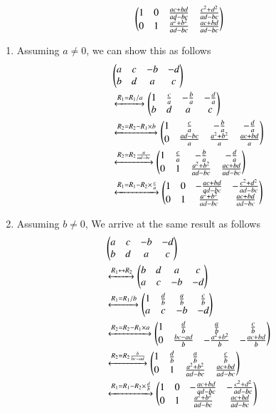 \documentclass[journal,12pt,twocolumn]{IEEEtran}
\begin{document}
\begin{align}
    \begin{pmatrix}1 & 0 & \frac{ac+bd}{ad-bc} & \frac{c^2+d^2}{ad-bc} \\ 0 & 1 & \frac{a^2+b^2}{ad-bc} & \frac{ac+bd}{ad-bc}\end{pmatrix}
\end{align}
\begin{enumerate}
    \item Assuming $a \neq 0$, we can show this as follows
    \begin{align}
        &\begin{pmatrix}a & c & -b & -d \\ b & d & a & c\end{pmatrix}  \nonumber \\
        &\xleftrightarrow{R_1 = R_1/a} \begin{pmatrix}1 & \frac{c}{a} & -\frac{b}{a} & -\frac{d}{a} \\ b & d & a & c\end{pmatrix} \nonumber \\
&\xleftrightarrow{R_2 = R_2 - R_1\times b} \begin{pmatrix}1 & \frac{c}{a} & -\frac{b}{a} & -\frac{d}{a} \\ 0 & \frac{ad-bc}{a} & \frac{a^2+b^2}{a} & \frac{ac+bd}{a}\end{pmatrix} \nonumber \\
&\xleftrightarrow{R_2 = R_2\frac{a}{ad-bc}} \begin{pmatrix}1 & \frac{c}{a} & -\frac{b}{a} & -\frac{d}{a} \\ 0 & 1 & \frac{a^2+b^2}{ad-bc} & \frac{ac+bd}{ad-bc}\end{pmatrix} \nonumber \\
&\xleftrightarrow{R_1 = R_1 - R_2\times\frac{c}{a}} \begin{pmatrix}1 & 0 & -\frac{ac+bd}{ad-bc} & -\frac{c^2+d^2}{ad-bc} \\ 0 & 1 & \frac{a^2+b^2}{ad-bc} & \frac{ac+bd}{ad-bc}\end{pmatrix} \nonumber
    \end{align}
\item Assuming $b \neq 0$, We arrive at the same result as follows
\begin{align}
    &\begin{pmatrix}a & c & -b & -d \\ b & d & a & c\end{pmatrix} \nonumber \\ 
    &\xleftrightarrow{R_1\leftrightarrow R_2} \begin{pmatrix} b & d & a & c \\ a & c & -b & -d \end{pmatrix} \nonumber \\
&\xleftrightarrow{R_1 = R_1/b}   \begin{pmatrix} 1 & \frac{d}{b} & \frac{a}{b} & \frac{c}{b} \\ a & c & -b & -d \end{pmatrix} \nonumber \\
&\xleftrightarrow{R_2 = R_2 - R_1\times a} \begin{pmatrix} 1 & \frac{d}{b} & \frac{a}{b} & \frac{c}{b} \\ 0 & \frac{bc-ad}{b} & -\frac{a^2+b^2}{b} & -\frac{ac+bd}{b}\end{pmatrix} \nonumber \\
&\xleftrightarrow{R_2 = R_2\frac{b}{bc-ad}} \begin{pmatrix} 1 & \frac{d}{b} & \frac{a}{b} & \frac{c}{b} \\ 0 & 1 & \frac{a^2+b^2}{ad-bc} & \frac{ac+bd}{ad-bc}\end{pmatrix} \nonumber \\
&\xleftrightarrow{R_1 = R_1 - R_2\times\frac{d}{b}} \begin{pmatrix}1 & 0 & -\frac{ac+bd}{ad-bc} & -\frac{c^2+d^2}{ad-bc} \\ 0 & 1 & \frac{a^2+b^2}{ad-bc} & \frac{ac+bd}{ad-bc}\end{pmatrix} \nonumber
\end{align}
\end{enumerate}
\end{document}
